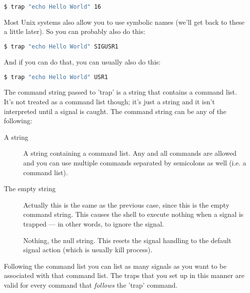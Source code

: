 \lstset{basicstyle=\scriptsize, numbers=left, captionpos=b, tabsize=4}
\begin{lstlisting}[caption=Trapping SIGUSR1,language={bash},
breaklines=true,xleftmargin=15pt,label=lstTrapping SIGUSR1:Trapping SIGUSR1]
$ trap "echo Hello World" 16
\end{lstlisting}

Most Unix systems also allow you to use symbolic names (we'll get back to these
a little later). So you can probably also do this:

\lstset{basicstyle=\scriptsize, numbers=left, captionpos=b, tabsize=4}
\begin{lstlisting}[caption=Trapping SIGUSR1 (little easier),language={bash},
breaklines=true,xleftmargin=15pt,label=lst:Trapping SIGUSR1 (little easier)]
$ trap "echo Hello World" SIGUSR1
\end{lstlisting}

And if you can do that, you can usually also do this:

\lstset{basicstyle=\scriptsize, numbers=left, captionpos=b, tabsize=4}
\begin{lstlisting}[caption=Trapping SIGUSR1 (even easier),language={bash},
breaklines=true,xleftmargin=15pt,label=lst:Trapping SIGUSR1 (even easier)]
$ trap "echo Hello World" USR1
\end{lstlisting}

The command string passed to 'trap' is a string that contains a command list.
It's not treated as a command list though; it's just a string and it isn't
interpreted until a signal is caught. The command string can be any of the
following:

\begin{description}
	\item[A string] A string containing a command list. Any and all commands
are allowed and you can use multiple commands separated by semicolons as well
(i.e. a command list).
	\item[The empty string] Actually this
is the same as the previous case, since this is the empty command string. This
causes the shell to execute nothing when a signal is trapped --- in other
words, to ignore the signal.
	\item[] Nothing, the null string. This resets the signal handling to the
default signal action (which is usually kill process).
\end{description}

Following the command list you can list as many signals as you want to be
associated with that command list. The traps that you set up in this manner are
valid for every command that \emph{follows} the 'trap' command.

